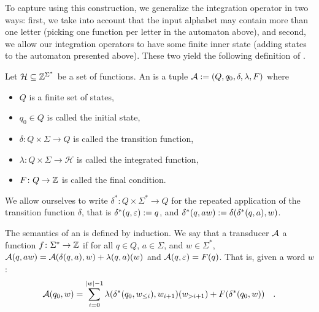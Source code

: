 To capture  using this construction, we
generalize the integration operator in two ways: first, we take into account
that the input alphabet may contain more than one letter (picking one function
per letter in the automaton above), and second, we allow our integration
operators to have some finite inner state (adding states to the automaton
presented above). These two yield the following definition of
.

\begin{definition}
    \label{oracle-transducer:def}
    Let $\mathcal{H} \subseteq \mathbb{Z}^{\Sigma^*}$ be a set of
    functions. An 
    is a tuple $\mathcal{A} \mathrel{:=} (Q, q_0, \delta, \lambda, F)$
    where
    \begin{itemize}
        \item $Q$ is a finite set of states,
        \item $q_0 \in Q$ is called the initial state,
        \item $\delta \colon Q \times \Sigma \to Q$ is called the transition function,
        \item $\lambda \colon Q \times \Sigma \to \mathcal{H}$ is called the integrated function,
        \item $F \colon Q \to \mathbb{Z}$ is called the final condition.
    \end{itemize}
    We allow ourselves to write $\delta^* \colon Q \times \Sigma^* \to Q$ for
    the repeated application of the transition function $\delta$, that is
    $\delta^*(q,\varepsilon) \mathrel{:=} q$, and $\delta^*(q, aw) \mathrel{:=} \delta(\delta^*(q,a), w)$.
\end{definition}

\AP The semantics of an  is defined by induction.
We say that a transducer $\mathcal{A}$  a function $f \colon
\Sigma^* \to \mathbb{Z}$ if for all $q \in Q$, $a \in \Sigma$, and $w \in \Sigma^*$,
$\mathcal{A}(q, aw) = \mathcal{A}(\delta(q,a), w) + \lambda(q, a)(w)$ and
$\mathcal{A}(q, \varepsilon) = F(q)$.
That is, given a word $w$:
\begin{equation}
    \label{transducer-semantics:eq}
    \mathcal{A}(q_0, w) 
    = \sum_{i=0}^{|w|-1} \lambda(\delta^*(q_0, w_{\leq i}), w_{i+1})(w_{> i+1}) + F(\delta^*(q_0, w))
    \quad 
    .
\end{equation}


